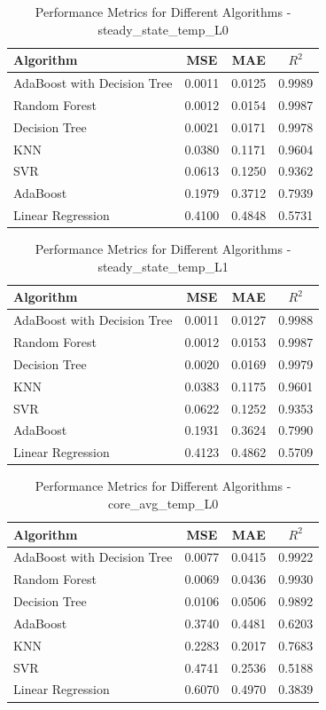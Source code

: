 \documentclass[conference]{IEEEtran}
\begin{document}
\begin{table}[htbp]
	\caption{Performance Metrics for Different Algorithms - steady\_state\_temp\_L0}
	\label{tab:steady_state_temp_L0}
	\begin{tabular}{lccc}
		\toprule
		\textbf{Algorithm} & \textbf{MSE} & \textbf{MAE} & \textbf{\(R^2\)} \\
		\midrule
		AdaBoost with Decision Tree & 0.0011 & 0.0125 & 0.9989 \\
		Random Forest & 0.0012 & 0.0154 & 0.9987 \\
		Decision Tree & 0.0021 & 0.0171 & 0.9978 \\
		KNN & 0.0380 & 0.1171 & 0.9604 \\
		SVR & 0.0613 & 0.1250 & 0.9362 \\
		AdaBoost & 0.1979 & 0.3712 & 0.7939 \\
		Linear Regression & 0.4100 & 0.4848 & 0.5731 \\
		\bottomrule
	\end{tabular}
\end{table}


\begin{table}[htbp]
	\caption{Performance Metrics for Different Algorithms - steady\_state\_temp\_L1}
	\label{tab:steady_state_temp_L1}
	\begin{tabular}{lccc}
		\toprule
		\textbf{Algorithm} & \textbf{MSE} & \textbf{MAE} & \textbf{\(R^2\)} \\
		\midrule
		AdaBoost with Decision Tree & 0.0011 & 0.0127 & 0.9988 \\
		Random Forest & 0.0012 & 0.0153 & 0.9987 \\
		Decision Tree & 0.0020 & 0.0169 & 0.9979 \\
		KNN & 0.0383 & 0.1175 & 0.9601 \\
		SVR & 0.0622 & 0.1252 & 0.9353 \\
		AdaBoost & 0.1931 & 0.3624 & 0.7990 \\
		Linear Regression & 0.4123 & 0.4862 & 0.5709 \\
		\bottomrule
	\end{tabular}
\end{table}


\begin{table}[htbp]
	\caption{Performance Metrics for Different Algorithms - core\_avg\_temp\_L0}
	\label{tab:core_avg_temp_L0}
	\begin{tabular}{lccc}
		\toprule
		\textbf{Algorithm} & \textbf{MSE} & \textbf{MAE} & \textbf{\(R^2\)} \\
		\midrule
		AdaBoost with Decision Tree & 0.0077 & 0.0415 & 0.9922 \\
		Random Forest & 0.0069 & 0.0436 & 0.9930 \\
		Decision Tree & 0.0106 & 0.0506 & 0.9892 \\
		AdaBoost & 0.3740 & 0.4481 & 0.6203 \\
		KNN & 0.2283 & 0.2017 & 0.7683 \\
		SVR & 0.4741 & 0.2536 & 0.5188 \\
		Linear Regression & 0.6070 & 0.4970 & 0.3839 \\
		\bottomrule
	\end{tabular}
\end{table}
\end{document}
